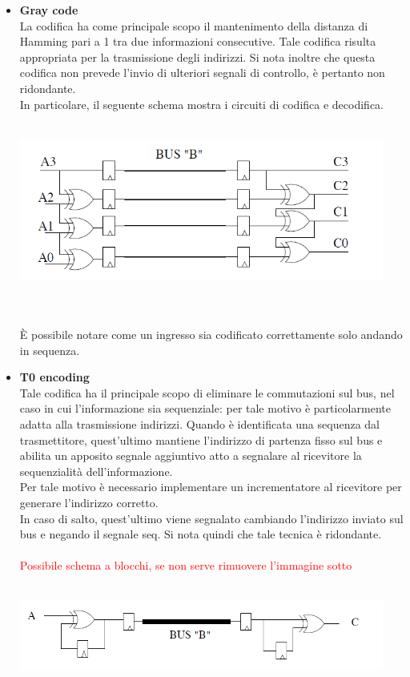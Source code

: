 \documentclass[11pt,  english, makeidx, a4paper, titlepage, oneside]{book}
\begin{document}
\begin{itemize}
\\\\
\item \textbf{Gray code}
\\
La codifica ha come principale scopo il mantenimento della distanza di Hamming pari a 1 tra due informazioni consecutive. Tale codifica risulta appropriata per la trasmissione degli indirizzi. Si nota inoltre che questa codifica non prevede l'invio di ulteriori segnali di controllo, è pertanto non ridondante.
\\
In particolare, il seguente schema mostra i circuiti di codifica e decodifica.
\\\\
\centerline{\includegraphics[width=12cm]{./img/Lab_4/gray.png}}
\\\\
È possibile notare come un ingresso sia codificato correttamente solo andando in sequenza.
\item \textbf{T0 encoding}
\\
Tale codifica ha il principale scopo di eliminare le commutazioni sul bus, nel caso in cui l'informazione sia sequenziale: per tale motivo è particolarmente adatta alla trasmissione indirizzi. Quando è identificata una sequenza dal trasmettitore, quest'ultimo mantiene l'indirizzo di partenza fisso sul bus e abilita un apposito segnale aggiuntivo atto a segnalare al ricevitore la sequenzialità dell'informazione.
\\
Per tale motivo è necessario implementare un incrementatore al ricevitore per generare l'indirizzo corretto.
\\
In caso di salto, quest'ultimo viene segnalato cambiando l'indirizzo inviato sul bus e negando il segnale seq.
Si nota quindi che tale tecnica è ridondante.
\\\\
\textcolor{red}{Possibile schema a blocchi, se non serve rimuovere l'immagine sotto}
\\\\
\centerline{\includegraphics[width=12cm]{./img/Lab_4/tran_based.png}}

\end{itemize}
\end{document}
